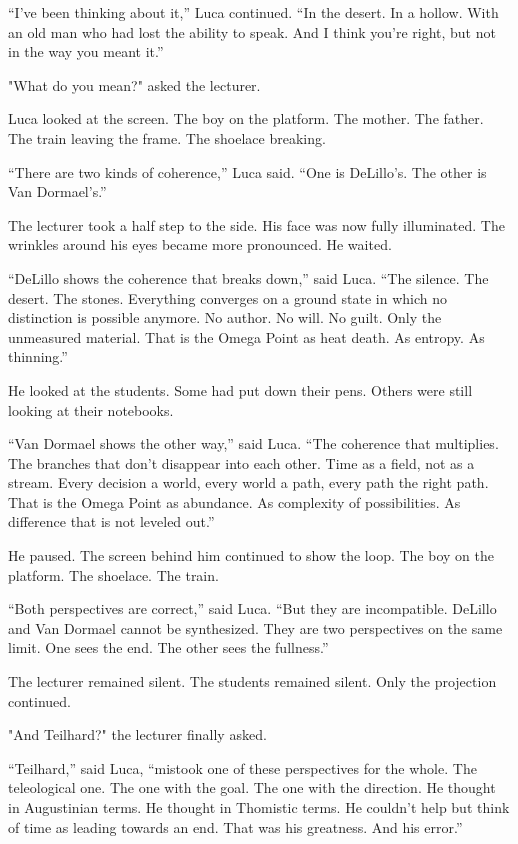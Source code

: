 \documentclass[
  ngerman,
]{article}
\begin{document}
``I've been thinking about it,'' Luca continued. ``In the desert. In a
hollow. With an old man who had lost the ability to speak. And I think
you're right, but not in the way you meant it.''

"What do you mean?" asked the lecturer.

Luca looked at the screen. The boy on the platform. The mother. The
father. The train leaving the frame. The shoelace breaking.

``There are two kinds of coherence,'' Luca said. ``One is DeLillo's. The
other is Van Dormael's.''

The lecturer took a half step to the side. His face was now fully
illuminated. The wrinkles around his eyes became more pronounced. He
waited.

``DeLillo shows the coherence that breaks down,'' said Luca. ``The
silence. The desert. The stones. Everything converges on a ground state
in which no distinction is possible anymore. No author. No will. No
guilt. Only the unmeasured material. That is the Omega Point as heat
death. As entropy. As thinning.''

He looked at the students. Some had put down their pens. Others were
still looking at their notebooks.

``Van Dormael shows the other way,'' said Luca. ``The coherence that
multiplies. The branches that don't disappear into each other. Time as a
field, not as a stream. Every decision a world, every world a path,
every path the right path. That is the Omega Point as abundance. As
complexity of possibilities. As difference that is not leveled out.''

He paused. The screen behind him continued to show the loop. The boy on
the platform. The shoelace. The train.

``Both perspectives are correct,'' said Luca. ``But they are
incompatible. DeLillo and Van Dormael cannot be synthesized. They are
two perspectives on the same limit. One sees the end. The other sees the
fullness.''

The lecturer remained silent. The students remained silent. Only the
projection continued.

"And Teilhard?" the lecturer finally asked.

``Teilhard,'' said Luca, ``mistook one of these perspectives for the
whole. The teleological one. The one with the goal. The one with the
direction. He thought in Augustinian terms. He thought in Thomistic
terms. He couldn't help but think of time as leading towards an end.
That was his greatness. And his error.''
\end{document}
